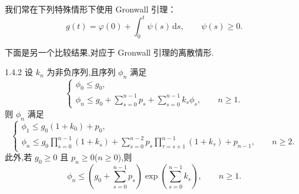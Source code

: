 我们常在下列特殊情形下使用 Gronwall 引理：
\begin{equation}\label{eq:1.4.5}
  g(t)=\varphi(0)+\int_0^t\psi(s)\,\mathrm ds,\qquad \psi(s)\ge0.
\end{equation}

下面是另一个比较结果,对应于 Gronwall 引理的离散情形.

\begin{lemma}[离散 Gronwall 引理]{1.4.2}
设 \(k_n\) 为非负序列,且序列 \(\phi_n\) 满足
\begin{equation}\label{eq:1.4.6}
  \begin{cases}
    \phi_0\le g_0,\\[2pt]
    \displaystyle\phi_n\le g_0+\sum_{s=0}^{n-1}p_s+\sum_{s=0}^{n-1}k_s\phi_s,\qquad n\ge1.
  \end{cases}
\end{equation}
则 \(\phi_n\) 满足
\begin{equation}\label{eq:1.4.7}
  \begin{cases}
    \phi_1\le g_0(1+k_0)+p_0,\\[2pt]
    \displaystyle
    \phi_n\le g_0\prod_{s=0}^{n-1}(1+k_s)+
      \sum_{s=0}^{n-2}p_s\prod_{\tau=s+1}^{n-1}(1+k_\tau)+p_{n-1},\qquad n\ge2.
  \end{cases}
\end{equation}
此外,若 \(g_0\ge0\) 且 \(p_n\ge0\)(\(n\ge0\)),则
\begin{equation}\label{eq:1.4.8}
  \phi_n\le\left(g_0+\sum_{s=0}^{n-1}p_s\right)\exp\!\left(\sum_{s=0}^{n-1}k_s\right),
  \qquad n\ge1.
\end{equation}
\end{lemma}

